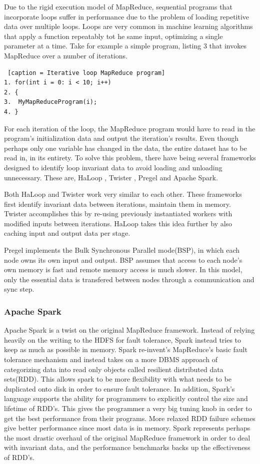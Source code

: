 \documentclass[10pt,twocolumn]{IEEEtran11}
\begin{document}
Due to the rigid execution model of MapReduce, sequential programs that incorporate loops suffer in performance due to the problem of loading repetitive data over multiple loops. Loops are very common in machine learning algorithms that apply a function repeatably tot he same input, optimizing a single parameter at a time. Take for example a simple program, listing 3 that invokes MapReduce over a number of iterations.

\begin{lstlisting} [caption = Iterative loop MapReduce program]
1. for(int i = 0: i < 10; i++)
2. {
3. 	MyMapReduceProgram(i);
4. }
\end{lstlisting}

For each iteration of the loop, the MapReduce program would have to read in the program's initialization data and output the iteration's results.  Even though perhaps only one variable has changed in the data, the entire dataset has to be read in, in its entirety.  To solve this problem, there have being several frameworks designed to identify loop invariant data to avoid loading and unloading unnecessary.   These are, HaLoop \cite{bu2010haloop}, Twister \cite{ekanayake2010twister},  Pregel \cite{malewicz2010pregel} and Apache Spark\cite{zaharia2010spark}. 
\par
Both HaLoop and Twister work very similar to each other.  These frameworks first identify invariant data between iterations, maintain them in memory.  Twister accomplishes this by re-using previously instantiated workers with modified inputs between iterations.  HaLoop takes this idea further by also caching input and output data per stage.
\par
Pregel implements the Bulk Synchronous Parallel mode(BSP), in which each node owns its own input and output.  BSP assumes that access to each node's own memory is fast and remote memory access is much slower.  In this model, only the essential data is transfered between nodes through a communication and sync step.  

\subsubsection{Apache Spark}
Apache Spark is a twist on the original MapReduce framework.  Instead of relying heavily on the writing to the HDFS for fault tolerance, Spark instead tries to keep as much as possible in memory.   Spark re-invent's MapReduce's basic fault tolerance mechanism and instead takes on a more DBMS approach of categorizing data into read only objects called resilient distributed data sets(RDD).  This allows spark to be more flexibility with what needs to be duplicated onto disk in order to ensure fault tolerance.  In addition, Spark's language supports the ability for programmers to explicitly control the size and lifetime of RDD's.  This gives the programmer a very big tuning knob in order to get the best performance  from their programs. More relaxed RDD failure schemes give better performance since most data is in memory.  Spark represents perhaps the most drastic overhaul of the original MapReduce framework in order to deal with invariant data, and the performance benchmarks backs up the effectiveness of RDD's.
\end{document}
